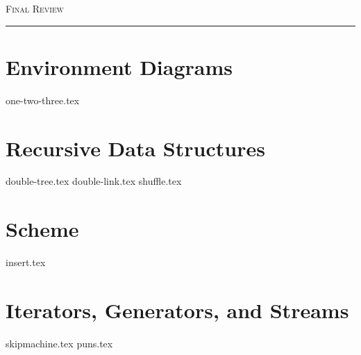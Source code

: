 \documentclass{exam}
\begin{document}
\newpage
{\huge \vspace*{0.5cm} \textsc{Final Review}}

\rule{\textwidth}{0.15em}

\section{Environment Diagrams}
\begin{questions}
{one-two-three.tex}
\end{questions}

\newpage
\section{Recursive Data Structures}
\begin{questions}
{double-tree.tex}
\newpage
{double-link.tex}
{shuffle.tex}
\end{questions}

\newpage
\section{Scheme}
\begin{questions}
{insert.tex}
\end{questions}

\newpage
\section{Iterators, Generators, and Streams}
\begin{questions}
{skipmachine.tex}
\newpage
{puns.tex}
\end{questions}




\end{document}
